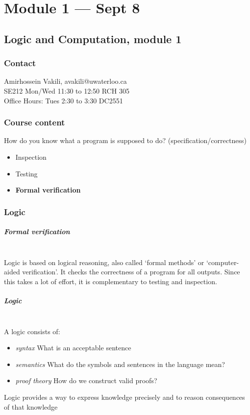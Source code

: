 \chapter{Module 1 --- Sept 8}
  \section{Logic and Computation, module 1}
    \subsection{Contact}
      Amirhossein Vakili, avakili@uwaterloo.ca\\
      SE212 Mon/Wed 11:30 to 12:50 RCH 305\\
      Office Hours: Tues 2:30 to 3:30 DC2551

    \subsection{Course content}
      How do you know what a program is supposed to do?
      (specification/correctness)
      \begin{itemize}
        \item Inspection
        \item Testing
        \item \textbf{Formal verification}
      \end{itemize}

    \subsection{Logic}
      \paragraph{Formal verification} \hspace{0pt}~\\
      Logic is based on logical reasoning, also called `formal methods' or
      `computer-aided verification'. It checks the correctness of a program
      for all outputs. Since this takes a lot of effort, it is complementary to
      testing and inspection.

      \paragraph{Logic}  \hspace{0pt}~\\
      A logic consists of:
      \begin{itemize}
        \item \textit{syntax} \: What is an acceptable sentence
        \item \textit{semantics} \: What do the symbols and sentences in the
          language mean?
        \item \textit{proof theory} \: How do we construct valid proofs?
      \end{itemize}
      Logic provides a way to express knowledge precisely and to reason
      consequences of that knowledge

